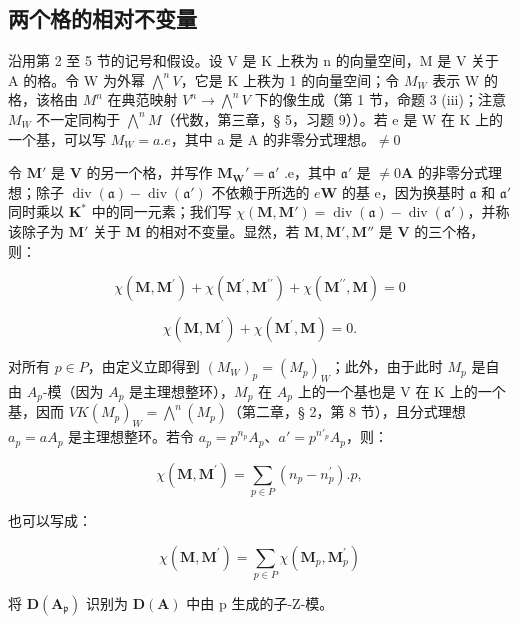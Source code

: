 \subsection{两个格的相对不变量}

沿用第 2 至 5 节的记号和假设。设 V 是 K 上秩为 n 的向量空间，M 是 V 关于 A 的格。令 W 为外幂 \(\bigwedge^{n}V\)，它是 K 上秩为 1 的向量空间；令 \(M_{W}\) 表示 W 的格，该格由 \(M^{n}\) 在典范映射 \(V^{n}\to\bigwedge^{n}V\) 下的像生成（第 1 节，命题 3 (iii)；注意 \(M_{W}\) 不一定同构于 \(\bigwedge^{n}M\)（代数，第三章，§ 5，习题 9））。若 e 是 W 在 K 上的一个基，可以写 \(M_{W}=a.e\)，其中 a 是 A 的非零分式理想。\(\neq0\)

令 \(\mathbf{M}'\) 是 \(\mathbf{V}\) 的另一个格，并写作 \(\mathbf{M}_{\mathbf{W}}' = \mathfrak{a}'\) .e，其中 \(\mathfrak{a}'\) 是 \(\neq 0\)\(\mathbf{A}\) 的非零分式理想；除子 \(\operatorname{div}(\mathfrak{a}) - \operatorname{div}(\mathfrak{a}')\) 不依赖于所选的 \(e\)\(\mathbf{W}\) 的基 e，因为换基时 \(\mathfrak{a}\) 和 \(\mathfrak{a}'\) 同时乘以 \(\mathbf{K}^*\) 中的同一元素；我们写 \(\chi(\mathbf{M}, \mathbf{M}') = \operatorname{div}(\mathfrak{a}) - \operatorname{div}(\mathfrak{a}')\)，并称该除子为 \(\mathbf{M}'\) 关于 \(\mathbf{M}\) 的相对不变量。显然，若 \(\mathbf{M}, \mathbf{M}', \mathbf{M}''\) 是 \(\mathbf{V}\) 的三个格，则：

\[
\chi (\mathbf {M}, \mathbf {M} ^ {\prime}) + \chi (\mathbf {M} ^ {\prime}, \mathbf {M} ^ {\prime \prime}) + \chi (\mathbf {M} ^ {\prime \prime}, \mathbf {M}) = 0\tag{3}
\]

\[
\chi (\mathbf {M}, \mathbf {M} ^ {\prime}) + \chi (\mathbf {M} ^ {\prime}, \mathbf {M}) = 0\tag{4}.
\]

对所有 \(p \in P\)，由定义立即得到 \((M_{W})_p = (M_p)_{W}\)；此外，由于此时 \(M_p\) 是自由 \(A_p\)-模（因为 \(A_p\) 是主理想整环），\(M_p\) 在 \(A_p\) 上的一个基也是 V 在 K 上的一个基，因而 \(V\)\(K\)\((M_p)_W = \bigwedge^n (M_p)\)（第二章，§ 2，第 8 节），且分式理想 \(a_p = aA_p\) 是主理想整环。若令 \(a_p = p^{n_p} A_p\)、\(a' = p^{n'_{p}} A_p\)，则：

\[
\chi (\mathbf {M}, \mathbf {M} ^ {\prime}) = \sum_ {p \in P} (n _ {p} - n _ {p} ^ {\prime}). p,
\]

也可以写成：

\[
\chi (\mathbf {M}, \mathbf {M} ^ {\prime}) = \sum_ {p \in P} \chi (\mathbf {M} _ {p}, \mathbf {M} _ {p} ^ {\prime})\tag{5}
\]

将 \(\mathbf{D}(\mathbf{A}_{\mathfrak{p}})\) 识别为 \(\mathbf{D}(\mathbf{A})\) 中由 p 生成的子-Z-模。

